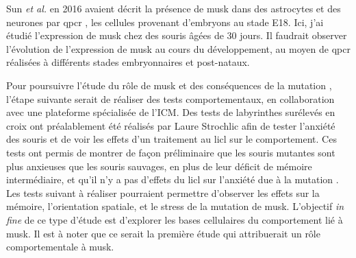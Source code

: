 Sun \emph{et al.} en 2016 avaient décrit la présence de \gls{musk} dans des astrocytes et des neurones par \gls{qpcr} \cite{Sun2016}, les cellules provenant d'embryons au stade E18. Ici, j'ai étudié l'expression de \gls{musk} chez des souris âgées de 30 jours. Il faudrait observer l'évolution de l'expression de \gls{musk} au cours du développement, au moyen de \gls{qpcr} réalisées à différents stades embryonnaires et post-nataux.

Pour poursuivre l'étude du rôle de \gls{musk} et des conséquences de la mutation \mcrd, l'étape suivante serait de réaliser des tests comportementaux, en collaboration avec une plateforme spécialisée de l'ICM. Des tests de labyrinthes surélevés en croix ont préalablement été réalisés par Laure Strochlic afin de tester l'anxiété des souris \mcrd et de voir les effets d'un traitement au \gls{licl} sur le comportement. Ces tests ont permis de montrer de façon préliminaire que les souris mutantes sont plus anxieuses que les souris sauvages, en plus de leur déficit de mémoire intermédiaire, et qu'il n'y a pas d'effets du \gls{licl} sur l'anxiété due à la mutation \mcrd. Les tests suivant à réaliser pourraient permettre d'observer les effets sur la mémoire, l'orientation spatiale, et le stress de la mutation de \gls{musk}. L'objectif \emph{in fine} de ce type d'étude est d'explorer les bases cellulaires du comportement lié à \gls{musk}. Il est à noter que ce serait la première étude qui attribuerait un rôle comportementale à \gls{musk}.